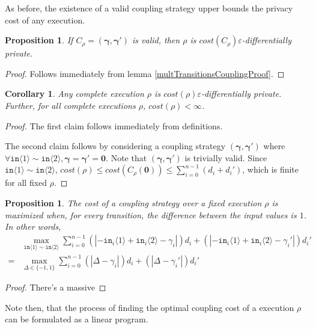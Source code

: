 \documentclass[12pt]{article}
\newcommand{\brangle}[1]{\langle #1 \rangle}
\newtheorem{prop}[thm]{Proposition}
\newtheorem{cor}[thm]{Corollary}
\theoremstyle{definition}
\begin{document}
As before, the existence of a valid coupling strategy upper bounds the privacy cost of any execution. 

\begin{prop}
    If $C_\rho=(\bm{\gamma}, \bm{\gamma}')$ is valid, then $\rho$ is $cost(C_\rho)\varepsilon$-differentially private.
\end{prop}

\begin{proof}
    Follows immediately from lemma \ref{multTransitionsCouplingProof}.
\end{proof}

\begin{cor}
    Any complete execution $\rho$ is $cost(\rho)\varepsilon$-differentially private. Further, for all complete executions $\rho$, $cost(\rho)<\infty$. 
\end{cor}

\begin{proof}
    The first claim follows immediately from definitions. 
    
    The second claim follows by considering a coupling strategy $(\bm{\gamma}, \bm{\gamma}')$ where $\forall \texttt{in}\brangle{1}\sim\texttt{in}\brangle{2}, \bm{\gamma} = \bm{\gamma}' = \bm{0}$. Note that $(\bm{\gamma}, \bm{\gamma}')$ is trivially valid. Since $\texttt{in}\brangle{1}\sim\texttt{in}\brangle{2}$, $cost(\rho)\leq cost(C_\rho(\bm{0}))\leq \sum_{i=0}^{n-1}(d_i+d_i')$, which is finite for all fixed $\rho$. 
\end{proof}


\begin{prop}
    The cost of a coupling strategy over a fixed execution $\rho$ is maximized when, for every transition, the difference between the input values is $1$. In other words,
    \begin{align*}
        &\max_{\texttt{in}\brangle{1}\sim \texttt{in}\brangle{2}} \sum_{i=0}^{n-1}(|-\texttt{in}_i\brangle{1}+\texttt{in}_i\brangle{2}-\gamma_i|)d_i+(|-\texttt{in}_i\brangle{1}+\texttt{in}_i\brangle{2}-\gamma_i'|)d_i' \\
        = &\max_{\Delta\in \{-1, 1\}} \sum_{i=0}^{n-1}(|\Delta-\gamma_i|)d_i+(|\Delta-\gamma_i'|)d_i'
    \end{align*}
\end{prop}
\begin{proof}
There's a massive 
\end{proof}

Note then, that the process of finding the optimal coupling cost of a execution $\rho$ can be formulated as a linear program.
 
\end{document}
